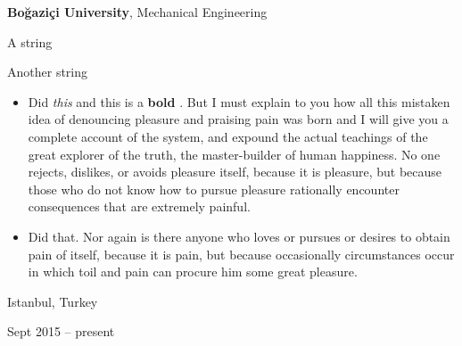 \documentclass[10pt, letterpaper]{article}
\newenvironment{summary}{
    \begin{description}[
        topsep=0.10 cm,
        parsep=0.10 cm,
        partopsep=0pt,
        itemsep=0pt,
        leftmargin=0.4 cm + 10pt
    ]
}{
    \end{description}
} %
\newenvironment{highlights}{
    \begin{itemize}[
        topsep=0.10 cm,
        parsep=0.10 cm,
        partopsep=0pt,
        itemsep=0pt,
        leftmargin=0.4 cm + 10pt
    ]
}{
    \end{itemize}
} %
\newenvironment{threecolentry}[3][]{
    \onecolentry
    \def\thirdColumn{#3}
    \setcolumnwidth{1 cm, \fill, 4.5 cm}
    \begin{paracol}{3}
    {\raggedright #2} \switchcolumn
}{
    \switchcolumn \raggedleft \thirdColumn
    \end{paracol}
    \endonecolentry
} %
\let\hrefWithoutArrow\href
\renewcommand{\href}[2]{\hrefWithoutArrow{#1}{\ifthenelse{\equal{#2}{}}{ }{#2 }\raisebox{.15ex}{\footnotesize \faExternalLink*}}}
\begin{document}
        \begin{threecolentry}{\textbf{}}{
            Istanbul, Turkey

        Sept 2015 – present
        }
            \textbf{Boğaziçi University}, Mechanical Engineering
            \begin{summary}
                \item A string
                \item Another string
            \end{summary}
            \begin{highlights}
                \item Did \textit{this} and this is a \textbf{bold} \href{https://example.com}{link}. But I must explain to you how all this mistaken idea of denouncing pleasure and praising pain was born and I will give you a complete account of the system, and expound the actual teachings of the great explorer of the truth, the master-builder of human happiness. No one rejects, dislikes, or avoids pleasure itself, because it is pleasure, but because those who do not know how to pursue pleasure rationally encounter consequences that are extremely painful.
                \item Did that. Nor again is there anyone who loves or pursues or desires to obtain pain of itself, because it is pain, but because occasionally circumstances occur in which toil and pain can procure him some great pleasure.
            \end{highlights}
        \end{threecolentry}

        \vspace{0.2 cm}
\end{document}
